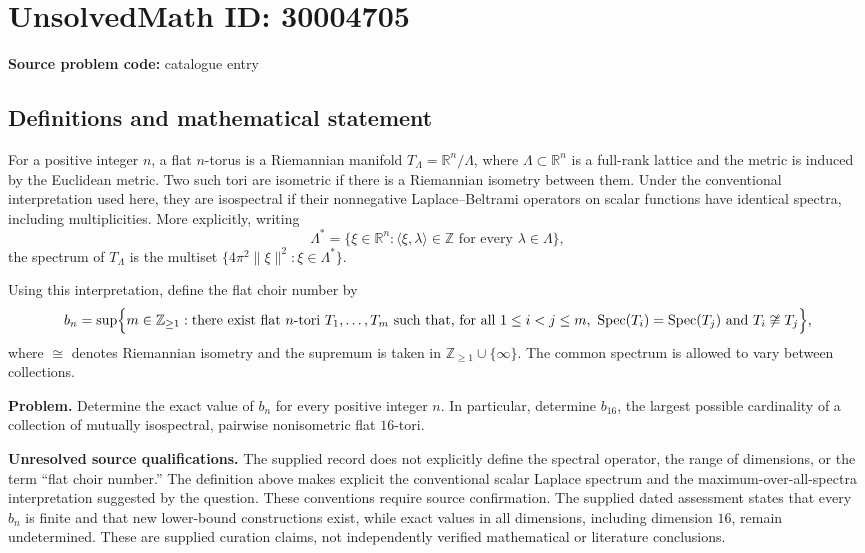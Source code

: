 \documentclass[11pt]{article}
\newcommand{\Z}{\mathbb{Z}}
\newcommand{\R}{\mathbb{R}}
\begin{document}
\section*{UnsolvedMath ID: 30004705}
\textbf{Source problem code:} catalogue entry
\subsection{Definitions and mathematical statement}
For a positive integer \(n\), a flat \(n\)-torus is a Riemannian manifold \(T_{\Lambda}=\R^n/\Lambda\), where \(\Lambda\subset\R^n\) is a full-rank lattice and the metric is induced by the Euclidean metric. Two such tori are isometric if there is a Riemannian isometry between them. Under the conventional interpretation used here, they are isospectral if their nonnegative Laplace--Beltrami operators on scalar functions have identical spectra, including multiplicities. More explicitly, writing
\[
\Lambda^*=\{\xi\in\R^n:\langle\xi,\lambda\rangle\in\Z\text{ for every }\lambda\in\Lambda\},
\]
the spectrum of \(T_{\Lambda}\) is the multiset \(\{4\pi^2\|\xi\|^2:\xi\in\Lambda^*\}\).

Using this interpretation, define the flat choir number by
\[
b_n=\sup\Bigl\{m\in\Z_{\geq 1}:\text{there exist flat }n\text{-tori }T_1,\ldots,T_m
\text{ such that, for all }1\leq i<j\leq m,
\ \operatorname{Spec}(T_i)=\operatorname{Spec}(T_j)
\text{ and }T_i\not\cong T_j\Bigr\},
\]
where \(\cong\) denotes Riemannian isometry and the supremum is taken in \(\Z_{\geq 1}\cup\{\infty\}\). The common spectrum is allowed to vary between collections.

\textbf{Problem.} Determine the exact value of \(b_n\) for every positive integer \(n\). In particular, determine \(b_{16}\), the largest possible cardinality of a collection of mutually isospectral, pairwise nonisometric flat \(16\)-tori.

\textbf{Unresolved source qualifications.} The supplied record does not explicitly define the spectral operator, the range of dimensions, or the term ``flat choir number.'' The definition above makes explicit the conventional scalar Laplace spectrum and the maximum-over-all-spectra interpretation suggested by the question. These conventions require source confirmation. The supplied dated assessment states that every \(b_n\) is finite and that new lower-bound constructions exist, while exact values in all dimensions, including dimension \(16\), remain undetermined. These are supplied curation claims, not independently verified mathematical or literature conclusions.
\end{document}
